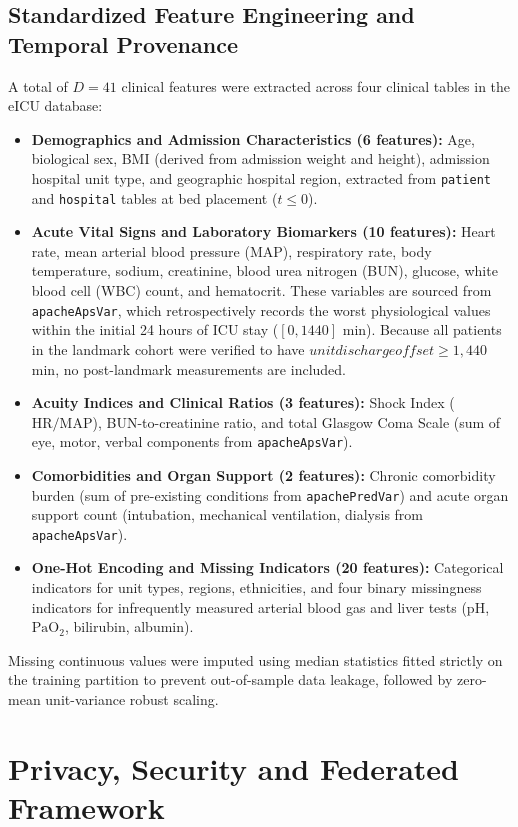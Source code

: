 \documentclass[conference]{IEEEtran}
\begin{document}
\subsection{Standardized Feature Engineering and Temporal Provenance}
A total of $D = 41$ clinical features were extracted across four clinical tables in the eICU database:
\begin{itemize}
    \item \textbf{Demographics and Admission Characteristics (6 features):} Age, biological sex, BMI (derived from admission weight and height), admission hospital unit type, and geographic hospital region, extracted from \texttt{patient} and \texttt{hospital} tables at bed placement ($t \le 0$).
    \item \textbf{Acute Vital Signs and Laboratory Biomarkers (10 features):} Heart rate, mean arterial blood pressure (MAP), respiratory rate, body temperature, sodium, creatinine, blood urea nitrogen (BUN), glucose, white blood cell (WBC) count, and hematocrit. These variables are sourced from \texttt{apacheApsVar}, which retrospectively records the worst physiological values within the initial 24 hours of ICU stay ($[0, 1440]$ min). Because all patients in the landmark cohort were verified to have $unitdischargeoffset \ge 1,440$ min, no post-landmark measurements are included.
    \item \textbf{Acuity Indices and Clinical Ratios (3 features):} Shock Index ($\text{HR} / \text{MAP}$), BUN-to-creatinine ratio, and total Glasgow Coma Scale (sum of eye, motor, verbal components from \texttt{apacheApsVar}).
    \item \textbf{Comorbidities and Organ Support (2 features):} Chronic comorbidity burden (sum of pre-existing conditions from \texttt{apachePredVar}) and acute organ support count (intubation, mechanical ventilation, dialysis from \texttt{apacheApsVar}).
    \item \textbf{One-Hot Encoding and Missing Indicators (20 features):} Categorical indicators for unit types, regions, ethnicities, and four binary missingness indicators for infrequently measured arterial blood gas and liver tests (pH, $\text{PaO}_2$, bilirubin, albumin).
\end{itemize}
Missing continuous values were imputed using median statistics fitted strictly on the training partition to prevent out-of-sample data leakage, followed by zero-mean unit-variance robust scaling.

\section{Privacy, Security and Federated Framework}
\end{document}
